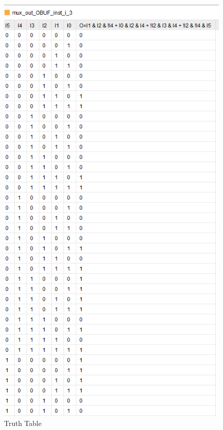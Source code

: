\documentclass{article}
\begin{document}
\begin{figure}[h]
\begin{center}
\includegraphics[width=1\textwidth]{MultiplexerTruthTable.png} %
\caption{Truth Table}
\end{center}
\end{figure}
\end{document}
